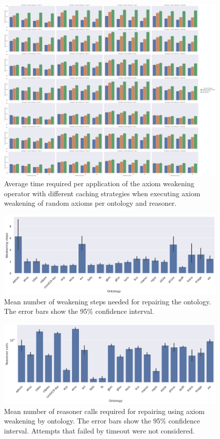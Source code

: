 \begin{figure}[htbp]
  \begin{widepage}[3cm]
    \centering
    \includegraphics[width=\textwidth]{resources/time-cache-ontology-reasoner-bar.png}
  \end{widepage}
  \caption{Average time required per application of the axiom weakening operator with different caching strategies when executing axiom weakening of random axioms per ontology and reasoner.}
\end{figure}

\begin{figure}[htbp]
  \centering
  \includegraphics[width=\textwidth]{resources/steps-ontology-bar.png}
  \caption{Mean number of weakening steps needed for repairing the ontology. The error bars show the 95\% confidence interval.}
\end{figure}

\begin{figure}[htbp]
  \centering
  \includegraphics[width=\textwidth]{resources/calls-ontology-bar.png}
  \caption{Mean number of reasoner calls required for repairing using axiom weakening by ontology. The error bars show the 95\% confidence interval. Attempts that failed by timeout were not considered.}
\end{figure}

